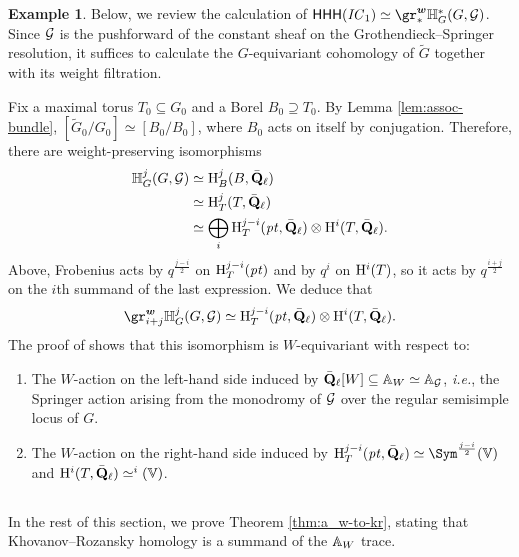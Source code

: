\documentclass[a4paper,10pt,leqno]{amsart}
\theoremstyle{plain}
\theoremstyle{plain}
\theoremstyle{plain}
\theoremstyle{definition}
\newtheorem{ex}[thm]{Example}
\theoremstyle{remark}
\let\Alt\relax
\DeclareMathOperator{\Alt}{\text{$\Lambda$}}
\newcommand{\IC}{\mathit{IC}}
\newcommand{\QL}{\bar{\mathbf{Q}}_\ell}
\newcommand{\point}{\mathit{pt}}
\begin{document}
\begin{ex}\label{ex:identity}
Below, we review the calculation of $\sf{HHH}(\IC_1) \simeq \gr_\ast^{\bm{w}} \bb{H}_G^\ast(G, \cal{G})$.
Since $\cal{G}$ is the pushforward of the constant sheaf on the Grothendieck--Springer resolution, it suffices to calculate the $G$-equivariant cohomology of $\tilde{G}$ together with its weight filtration.

Fix a maximal torus $T_0 \subseteq G_0$ and a Borel $B_0 \supseteq T_0$.
By Lemma \ref{lem:assoc-bundle}, $[\tilde{G}_0/G_0] \simeq [B_0/B_0]$, where $B_0$ acts on itself by conjugation.
Therefore, there are weight-preserving isomorphisms
\begin{align}\begin{split}
\bb{H}_G^j(G, \cal{G}) 
&\simeq \ur{H}_B^j(B, \QL) \\
&\simeq \ur{H}_T^j(T, \QL) \\
&\simeq \bigoplus_i {\ur{H}_T^{j - i}(\point, \QL) \otimes \ur{H}^i(T, \QL)}.
\end{split}\end{align}
Above, Frobenius acts by $q^{\frac{j - i}{2}}$ on $\ur{H}_T^{j - i}(\point)$ and by $q^i$ on $\ur{H}^i(T)$, so it acts by $q^{\frac{i + j}{2}}$ on the $i$th summand of the last expression.
We deduce that 
\begin{align}
\gr_{i + j}^{\bm{w}} \bb{H}_G^j(G, \cal{G}) \simeq \ur{H}_T^{j - i}(\point, \QL) \otimes \ur{H}^i(T, \QL).
\end{align}
The proof of \cite[Prop.\ 11]{ww_2011} shows that this isomorphism is $W$-equivariant with respect to:
\begin{enumerate}
\item 	The $W$-action on the left-hand side induced by $\QL[W] \subseteq \bb{A}_W \simeq \bb{A}_\cal{G}$, \emph{i.e.}, the Springer action arising from the monodromy of $\cal{G}$ over the regular semisimple locus of $G$.
\item 	The $W$-action on the right-hand side induced by $\ur{H}_T^{j - i}(\point, \QL) \simeq \Sym^{\frac{j - i}{2}}(\bb{V})$ and  $\ur{H}^i(T, \QL) \simeq \Alt^i(\bb{V})$.
\end{enumerate}
\end{ex}

\subsection{}

In the rest of this section, we prove Theorem \ref{thm:a_w-to-kr}, stating that Khovanov--Rozansky homology is a summand of the $\bb{A}_W$ trace.
\end{document}
